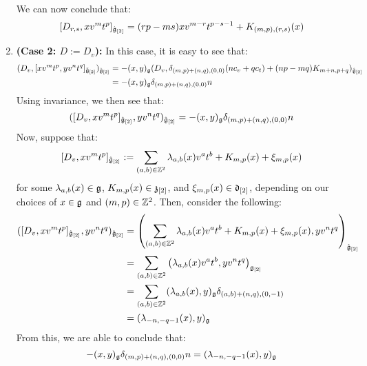 \begin{remark}
\begin{enumerate}
                    We can now conclude that:
                        $$[D_{r, s}, x v^m t^p]_{\hat{\mathfrak{g}}_{[2]}} = ( rp - ms ) x v^{m - r} t^{p - s - 1} + K_{(m, p), (r, s)}(x)$$
                    \item \textbf{(Case 2: $D := D_v$):} In this case, it is easy to see that:
                        $$
                            \begin{aligned}
                                ( D_v, [x v^m t^p, y v^n t^q]_{\tilde{\mathfrak{g}}_{[2]}} )_{\hat{\mathfrak{g}}_{[2]}} & = -(x, y)_{\mathfrak{g}} ( D_v, \delta_{(m, p) + (n, q), (0, 0)} ( n c_v + q c_t ) + (np - mq) K_{m + n, p + q} )_{\hat{\mathfrak{g}}_{[2]}}
                                \\
                                & = -(x, y)_{\mathfrak{g}} \delta_{(m, p) + (n, q), (0, 0)} n
                            \end{aligned}
                        $$
                    Using invariance, we then see that:
                        $$( [D_v, x v^m t^p]_{\hat{\mathfrak{g}}_{[2]}}, y v^n t^q )_{\hat{\mathfrak{g}}_{[2]}} = -(x, y)_{\mathfrak{g}} \delta_{(m, p) + (n, q), (0, 0)} n$$
                    Now, suppose that:
                        $$[D_v, x v^m t^p]_{\hat{\mathfrak{g}}_{[2]}} := \sum_{(a, b) \in \mathbb{Z}^2} \lambda_{a, b}(x) v^a t^b + K_{m, p}(x) + \xi_{m, p}(x)$$
                    for some $\lambda_{a, b}(x) \in \mathfrak{g}$, $K_{m, p}(x) \in \mathfrak{z}_{[2]}$, and $\xi_{m, p}(x) \in \mathfrak{d}_{[2]}$, depending on our choices of $x \in \mathfrak{g}$ and $(m, p) \in \mathbb{Z}^2$. Then, consider the following:
                        $$
                            \begin{aligned}
                                ( [D_v, x v^m t^p]_{\hat{\mathfrak{g}}_{[2]}}, y v^n t^q )_{\hat{\mathfrak{g}}_{[2]}} & = \left( \sum_{(a, b) \in \mathbb{Z}^2} \lambda_{a, b}(x) v^a t^b + K_{m, p}(x) + \xi_{m, p}(x), y v^n t^q \right)_{\hat{\mathfrak{g}}_{[2]}}
                                \\
                                & = \sum_{(a, b) \in \mathbb{Z}^2} \left( \lambda_{a, b}(x) v^a t^b, y v^n t^q \right)_{\mathfrak{g}_{[2]}}
                                \\
                                & = \sum_{(a, b) \in \mathbb{Z}^2} (\lambda_{a, b}(x), y)_{\mathfrak{g}} \delta_{ (a, b) + (n, q), (0, -1) }
                                \\
                                & = (\lambda_{-n, -q - 1}(x), y)_{\mathfrak{g}}
                            \end{aligned}
                        $$
                    From this, we are able to conclude that:
                        $$-(x, y)_{\mathfrak{g}} \delta_{(m, p) + (n, q), (0, 0)} n = (\lambda_{-n, -q - 1}(x), y)_{\mathfrak{g}}$$

\end{enumerate}
\end{remark}
